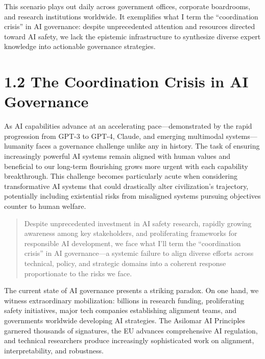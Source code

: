 \documentclass[
  11pt,
  letterpaper,
]{book}
\begin{document}
This scenario plays out daily across government offices, corporate
boardrooms, and research institutions worldwide. It exemplifies what I
term the ``coordination crisis'' in AI governance: despite unprecedented
attention and resources directed toward AI safety, we lack the epistemic
infrastructure to synthesize diverse expert knowledge into actionable
governance strategies.

\section*{1.2 The Coordination Crisis in AI
Governance}\label{sec-coordination-crisis}


As AI capabilities advance at an accelerating pace---demonstrated by the
rapid progression from GPT-3 to GPT-4, Claude, and emerging multimodal
systems---humanity faces a governance challenge unlike any in history.
The task of ensuring increasingly powerful AI systems remain aligned
with human values and beneficial to our long-term flourishing grows more
urgent with each capability breakthrough. This challenge becomes
particularly acute when considering transformative AI systems that could
drastically alter civilization's trajectory, potentially including
existential risks from misaligned systems pursuing objectives counter to
human welfare.

\begin{quote}
Despite unprecedented investment in AI safety research, rapidly growing
awareness among key stakeholders, and proliferating frameworks for
responsible AI development, we face what I'll term the ``coordination
crisis'' in AI governance---a systemic failure to align diverse efforts
across technical, policy, and strategic domains into a coherent response
proportionate to the risks we face.
\end{quote}

The current state of AI governance presents a striking paradox. On one
hand, we witness extraordinary mobilization: billions in research
funding, proliferating safety initiatives, major tech companies
establishing alignment teams, and governments worldwide developing AI
strategies. The Asilomar AI Principles garnered thousands of signatures,
the EU advances comprehensive AI regulation, and technical researchers
produce increasingly sophisticated work on alignment, interpretability,
and robustness.
\end{document}

